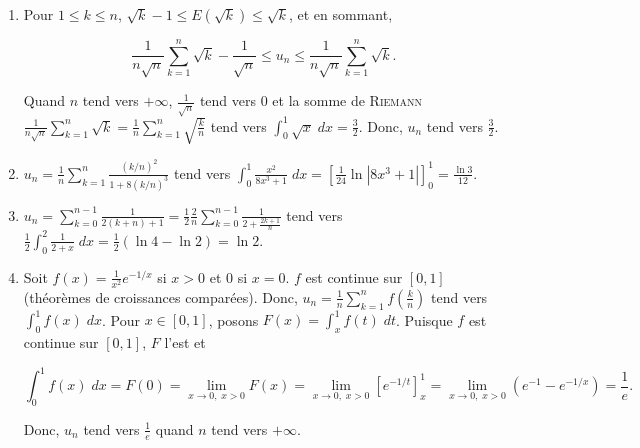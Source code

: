 {{\begin{enumerate}
et 

\begin{align*}\ensuremath
u_n&=\frac{1}{n}\sum_{k=1}^{n-2}\frac{1}{\sqrt{1-(\frac{k}{n})^2}}+\frac{1}{\sqrt{n^2-(n-1)^2}}\leq\int_{\frac{1}{n}}^{1-\frac{1}{n}}\frac{1}{\sqrt{1-x^2}}\;dx+\frac{1}{\sqrt{2n-1}}\\
 &=\Arcsin(1-\frac{1}{n})-\Arcsin\frac{1}{n}+\frac{1}{\sqrt{2n-1}}.
\end{align*}

Quand $n$ tend vers $+\infty$, les deux membres de cet encadrement tendent vers $\Arcsin1=\frac{\pi}{2}$, et donc $u_n$ tend vers $\frac{\pi}{2}$.

\item  Pour $1\leq k\leq n$, $\sqrt{k}-1\leq E(\sqrt{k})\leq \sqrt{k}$, et en sommant,

$$\frac{1}{n\sqrt{n}}\sum_{k=1}^{n}\sqrt{k}-\frac{1}{\sqrt{n}}\leq u_n\leq \frac{1}{n\sqrt{n}}\sum_{k=1}^{n}\sqrt{k}.$$

Quand $n$ tend vers $+\infty$, $\frac{1}{\sqrt{n}}$ tend vers $0$ et la somme de \textsc{Riemann} $\frac{1}{n\sqrt{n}}\sum_{k=1}^{n}\sqrt{k}=\frac{1}{n}\sum_{k=1}^{n}\sqrt{\frac{k}{n}}$ tend vers $\int_{0}^{1}\sqrt{x}\;dx=\frac{3}{2}$. Donc, $u_n$ tend vers $\frac{3}{2}$.

\item  $u_n=\frac{1}{n}\sum_{k=1}^{n}\frac{(k/n)^2}{1+8(k/n)^3}$ tend vers $\int_{0}^{1}\frac{x^2}{8x^3+1}\;dx=\left[\frac{1}{24}\ln|8x^3+1|\right]_{0}^{1}=\frac{\ln3}{12}$.

\item  $u_n=\sum_{k=0}^{n-1}\frac{1}{2(k+n)+1}=\frac{1}{2}\frac{2}{n}\sum_{k=0}^{n-1}\frac{1}{2+\frac{2k+1}{n}}$ tend vers $\frac{1}{2}\int_{0}^{2}\frac{1}{2+x}\;dx=\frac{1}{2}(\ln4-\ln2)=\ln2$.

\item  Soit $f(x)=\frac{1}{x^2}e^{-1/x}$ si $x>0$ et $0$ si $x=0$. $f$ est continue sur $[0,1]$ (théorèmes de croissances comparées). Donc, $u_n=\frac{1}{n}\sum_{k=1}^{n}f(\frac{k}{n})$ tend vers $\int_{0}^{1}f(x)\;dx$. Pour $x\in[0,1]$, posons $F(x)=\int_{x}^{1}f(t)\;dt$. Puisque $f$ est continue sur $[0,1]$, $F$ l'est et

$$\int_{0}^{1}f(x)\;dx=F(0)=\lim_{x\rightarrow 0,\;x>0}F(x)=\lim_{x\rightarrow 0,\;x>0}\left[e^{-1/t}\right]_{x}^{1}=\lim_{x\rightarrow 0,\;x>0}(e^{-1}-e^{-1/x})=\frac{1}{e}.$$

Donc, $u_n$ tend vers $\frac{1}{e}$ quand $n$ tend vers $+\infty$.

\end{enumerate}}
}